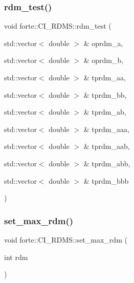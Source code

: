 \subsubsection{\texorpdfstring{rdm\+\_\+test()}{rdm\_test()}}
{\footnotesize\ttfamily void forte\+::\+C\+I\+\_\+\+R\+D\+M\+S\+::rdm\+\_\+test (\begin{DoxyParamCaption}\item[{std\+::vector$<$ double $>$ \&}]{oprdm\+\_\+a,  }\item[{std\+::vector$<$ double $>$ \&}]{oprdm\+\_\+b,  }\item[{std\+::vector$<$ double $>$ \&}]{tprdm\+\_\+aa,  }\item[{std\+::vector$<$ double $>$ \&}]{tprdm\+\_\+bb,  }\item[{std\+::vector$<$ double $>$ \&}]{tprdm\+\_\+ab,  }\item[{std\+::vector$<$ double $>$ \&}]{tprdm\+\_\+aaa,  }\item[{std\+::vector$<$ double $>$ \&}]{tprdm\+\_\+aab,  }\item[{std\+::vector$<$ double $>$ \&}]{tprdm\+\_\+abb,  }\item[{std\+::vector$<$ double $>$ \&}]{tprdm\+\_\+bbb }\end{DoxyParamCaption})}

\mbox{\label{classforte_1_1_c_i___r_d_m_s_ad3d9e1ffe533bbe89b33be83a84da01d}} 
\subsubsection{\texorpdfstring{set\+\_\+max\+\_\+rdm()}{set\_max\_rdm()}}
{\footnotesize\ttfamily void forte\+::\+C\+I\+\_\+\+R\+D\+M\+S\+::set\+\_\+max\+\_\+rdm (\begin{DoxyParamCaption}\item[{int}]{rdm }\end{DoxyParamCaption})}

\mbox{\label{classforte_1_1_c_i___r_d_m_s_aca80a64f8d50eb8784ad27804881938b}} 
